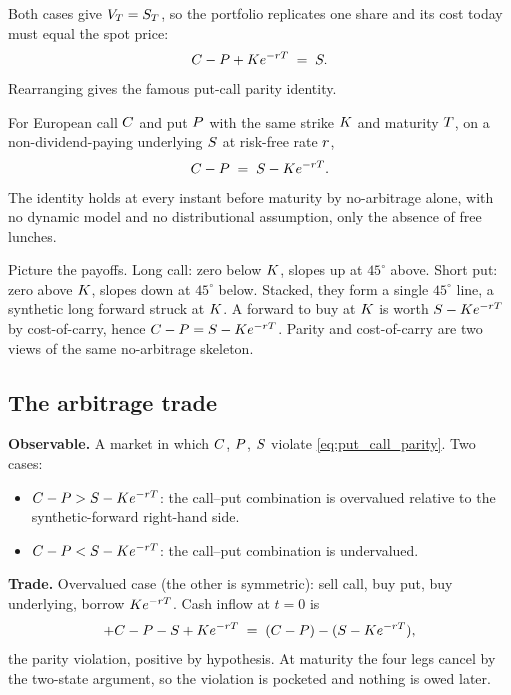 Both cases give $V_T = S_T$, so the portfolio replicates one
share and its cost today must equal the spot price:
\begin{equation*}
  C - P + K e^{-r T} \;=\; S.
\end{equation*}
Rearranging gives the famous put-call parity identity.

\begin{keyfactbox}
\label{kf:put_call_parity}
For European call $C$ and put $P$ with the same strike
$K$ and maturity $T$, on a non-dividend-paying
underlying $S$ at risk-free rate $r$,
\begin{equation}
  C - P \;=\; S - K e^{-r T}.
  \label{eq:put_call_parity}
\end{equation}
The identity holds at every instant before maturity by
no-arbitrage alone, with no dynamic model and no distributional
assumption, only the absence of free lunches.
\end{keyfactbox}

\begin{intuitionbox}
Picture the payoffs. Long call: zero below $K$, slopes
up at $45^\circ$ above. Short put: zero above $K$,
slopes down at $45^\circ$ below. Stacked, they form a single
$45^\circ$ line, a synthetic long forward struck at
$K$. A forward to buy at $K$ is worth $S -
K e^{-r T}$ by cost-of-carry, hence $C - P
= S - K e^{-r T}$. Parity and cost-of-carry are
two views of the same no-arbitrage skeleton.
\end{intuitionbox}

\subsection{The arbitrage trade}
\label{sec:ch13_parity_trade}

\textbf{Observable.} A market in which $C$, $P$, $S$
violate \eqref{eq:put_call_parity}. Two cases:
\begin{itemize}
  \item $C - P > S - K e^{-r T}$: the
  call--put combination is overvalued relative to the
  synthetic-forward right-hand side.
  \item $C - P < S - K e^{-r T}$: the
  call--put combination is undervalued.
\end{itemize}

\textbf{Trade.} Overvalued case (the other is symmetric): sell
call, buy put, buy underlying, borrow $K e^{-r
T}$. Cash inflow at $t=0$ is
\begin{equation*}
  +C - P - S + K e^{-r T}
  \;=\; (C - P) - (S - K e^{-r T}),
\end{equation*}
the parity violation, positive by hypothesis. At maturity the
four legs cancel by the two-state argument, so the violation is
pocketed and nothing is owed later.

